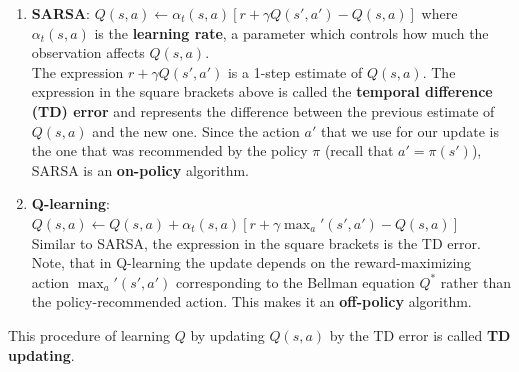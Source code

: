 \begin{enumerate}
    \item \textbf{SARSA}: $Q(s, a) \leftarrow \alpha_t(s, a)[r + \gamma Q(s', a') - Q(s, a)]$ where $\alpha_t(s, a)$ is the \textbf{learning rate}, a parameter which controls how much the observation affects $Q(s, a)$.\\
    The expression $r + \gamma Q(s', a')$ is a 1-step estimate of $Q(s, a)$. The expression in the square brackets above is called the \textbf{temporal difference (TD) error} and represents the difference between the previous estimate of $Q(s, a)$ and the new one. Since the action $a'$ that we use for our update is the one that was recommended by the policy $\pi$ (recall that $a' = \pi(s')$), SARSA is an \textbf{on-policy} algorithm.
    \item \textbf{Q-learning}: $Q(s, a) \leftarrow Q(s, a) + \alpha_t(s, a)[r + \gamma\max_a'(s', a') - Q(s, a)]$\\
    Similar to SARSA, the expression in the square brackets is the TD error. Note, that in Q-learning the update depends on the reward-maximizing action $\max_a'(s', a')$ corresponding to the Bellman equation $Q^*$ rather than the policy-recommended action. This makes it an \textbf{off-policy} algorithm.
\end{enumerate}
This procedure of learning $Q$ by updating $Q(s, a)$ by the TD error is called \textbf{TD updating}.
